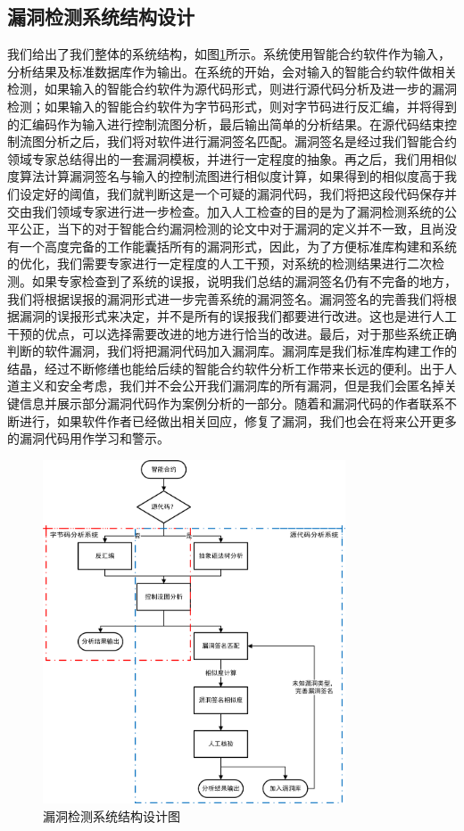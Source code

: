 \subsection{漏洞检测系统结构设计}
我们给出了我们整体的系统结构，如图\ref{fig:system_diagram}所示。系统使用智能合约软件作为输入，分析结果及标准数据库作为输出。在系统的开始，会对输入的智能合约软件做相关检测，如果输入的智能合约软件为源代码形式，则进行源代码分析及进一步的漏洞检测；如果输入的智能合约软件为字节码形式，则对字节码进行反汇编，并将得到的汇编码作为输入进行控制流图分析，最后输出简单的分析结果。在源代码结束控制流图分析之后，我们将对软件进行漏洞签名匹配。漏洞签名是经过我们智能合约领域专家总结得出的一套漏洞模板，并进行一定程度的抽象。再之后，我们用相似度算法计算漏洞签名与输入的控制流图进行相似度计算，如果得到的相似度高于我们设定好的阈值，我们就判断这是一个可疑的漏洞代码，我们将把这段代码保存并交由我们领域专家进行进一步检查。加入人工检查的目的是为了漏洞检测系统的公平公正，当下的对于智能合约漏洞检测的论文中对于漏洞的定义并不一致，且尚没有一个高度完备的工作能囊括所有的漏洞形式，因此，为了方便标准库构建和系统的优化，我们需要专家进行一定程度的人工干预，对系统的检测结果进行二次检测。如果专家检查到了系统的误报，说明我们总结的漏洞签名仍有不完备的地方，我们将根据误报的漏洞形式进一步完善系统的漏洞签名。漏洞签名的完善我们将根据漏洞的误报形式来决定，并不是所有的误报我们都要进行改进。这也是进行人工干预的优点，可以选择需要改进的地方进行恰当的改进。最后，对于那些系统正确判断的软件漏洞，我们将把漏洞代码加入漏洞库。漏洞库是我们标准库构建工作的结晶，经过不断修缮也能给后续的智能合约软件分析工作带来长远的便利。出于人道主义和安全考虑，我们并不会公开我们漏洞库的所有漏洞，但是我们会匿名掉关键信息并展示部分漏洞代码作为案例分析的一部分。随着和漏洞代码的作者联系不断进行，如果软件作者已经做出相关回应，修复了漏洞，我们也会在将来公开更多的漏洞代码用作学习和警示。
\begin{figure}[b]
\vspace{+2mm}
  \centering
  \includegraphics[width=0.8\textwidth]{figures/system_diagram.png}
  \caption{漏洞检测系统结构设计图}
  \label{fig:system_diagram}
\vspace{-5mm}
\end{figure} 

